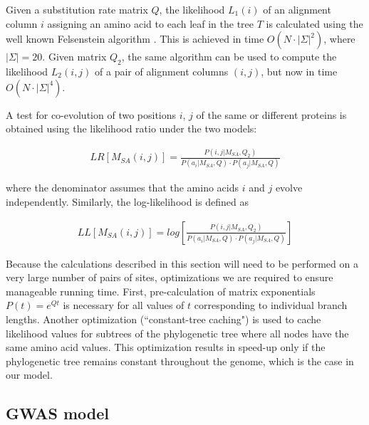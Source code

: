 Given a substitution rate matrix $Q$, the likelihood $L_1(i)$ of an alignment column $i$ assigning an amino acid to each leaf in the tree $T$ is calculated using the well known Felsenstein algorithm \cite{felsenstein2004inferring}. This is achieved in time $O(N \cdot |\Sigma|^2)$, where $|\Sigma|=20$. Given matrix $Q_2$, the same algorithm can be used to compute the likelihood $L_2(i,j)$ of a pair of alignment columns $(i,j)$, but now in time $O(N \cdot |\Sigma|^4)$. 

A test for co-evolution of two positions $i$, $j$ of the same or different proteins is obtained using the likelihood ratio under the two models: 

\begin{eqnarray*}
	LR[{M_{SA}}(i,j)] = \frac{P(i, j | M_{SA}, Q_2)}{P(a_i | M_{SA}, Q) \cdot P(a_j | M_{SA}, Q)}
\end{eqnarray*}

where the denominator assumes that the amino acids $i$ and $j$ evolve independently. Similarly, the log-likelihood is defined as

\begin{eqnarray}
	LL[M_{SA}(i,j)] = log \left[ \frac{P(i, j | M_{SA}, Q_2)}{P(a_i | M_{SA}, Q) \cdot P(a_j | M_{SA}, Q)} \right]
\end{eqnarray}



Because the calculations described in this section will need to be performed on a very large number of pairs of sites, optimizations we are required to ensure manageable running time. First, pre-calculation of  matrix exponentials $P(t) = e^{Qt}$ is necessary for all values of $t$ corresponding to individual branch lengths. Another optimization (``constant-tree caching") is used to cache likelihood values for subtrees of the phylogenetic tree where all nodes have the same amino acid values. This optimization results in speed-up only if the phylogenetic tree remains constant throughout the genome, which is the case in our model.

\subsection{GWAS model}

